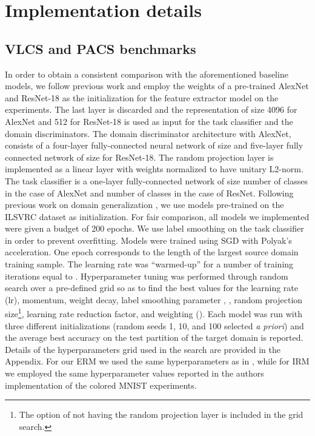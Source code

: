 \documentclass{article}
\begin{document}
\section{Implementation details}
\subsection{VLCS and PACS benchmarks}
In order to obtain a consistent comparison with the aforementioned baseline models, we follow previous work and employ the weights of a pre-trained AlexNet \cite{krizhevsky2012imagenet} and ResNet-18 \cite{he2016deep}  as the initialization for the feature extractor model on the experiments. \iffalse  with both benchmarks \fi The last layer is discarded and the representation of size 4096 for AlexNet and 512 for ResNet-18 is used as input for the task classifier and the domain discriminators. The domain discriminator architecture with AlexNet, consists of a four-layer fully-connected neural network of size  and five-layer fully connected network of size  for ResNet-18. The random projection layer is implemented as a linear layer with weights normalized to have unitary L2-norm. The task classifier is a one-layer fully-connected network of size  number of classes in the case of AlexNet and  number of classes in the case of ResNet.
Following previous work on domain generalization \cite{li2017deeper, li2019episodic}, we use models pre-trained on the ILSVRC dataset \cite{ILSVRC15} as initialization. For fair comparison, all models we implemented were given a budget of 200 epochs. We use label smoothing \cite{szegedy2016rethinking} on the task classifier in order to prevent overfitting. Models were trained using SGD with Polyak's acceleration. One epoch corresponds to the length of the largest source domain training sample. The learning rate was ``warmed-up'' for a number of training iterations equal to . Hyperparameter tuning was performed through random search over a pre-defined grid so as to find the best values for the learning rate (lr), momentum, weight decay, label smoothing parameter , , random projection size\footnote{The option of not having the random projection layer is included in the grid search.},
learning rate reduction factor, and weighting (). Each model was run with three different initializations (random seeds 1, 10, and 100 selected \textit{a priori}) and the average best accuracy on the test partition of the target domain is reported. Details of the hyperparameters grid used in the search are provided in the Appendix. For our ERM we used the same hyperparameters as in \cite{carlucci2019domain}, while for IRM we employed the same hyperparameter values reported in the authors implementation of the colored MNIST experiments.
\end{document}
